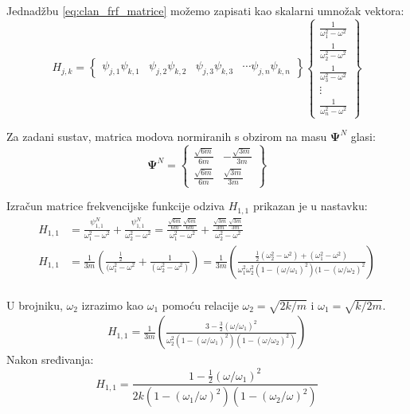 \documentclass{rgn}
\newcommand\ffrac[2]{\frac{\displaystyle #1}{\displaystyle #2}}
\newcommand\ppsi{\mathbf{\Psi}}
\begin{document}
Jednadžbu \eqref{eq:clan_frf_matrice} možemo zapisati kao skalarni umnožak vektora:
\begin{equation}\label{eq:clan_frf_matrica_vektorski}
    H_{j,k}
    =
    \begin{Bmatrix}
        \psi_{j,1}\psi_{k,1} &
        \psi_{j,2}\psi_{k,2} &
        \psi_{j,3}\psi_{k,3} &
        \cdots
        \psi_{j,n}\psi_{k,n}
    \end{Bmatrix}
    \begin{Bmatrix}
        \ffrac{1}{\omega_1^2-\omega^2}\\[6pt]
        \ffrac{1}{\omega_2^2-\omega^2}\\[6pt]
        \ffrac{1}{\omega_3^2-\omega^2}\\[6pt]
        \vdots\\[6pt]
        \ffrac{1}{\omega_n^2-\omega^2}
    \end{Bmatrix}
\end{equation}

Za zadani sustav, matrica modova normiranih s obzirom na masu $\ppsi^N$ glasi:
\[
    \ppsi^N
    =
    \begin{Bmatrix}
        \ffrac{\sqrt{6m}}{6m} & -\ffrac{\sqrt{3m}}{3m}\\[12pt]
        \ffrac{\sqrt{6m}}{6m} & \ffrac{\sqrt{3m}}{3m}
    \end{Bmatrix}
\]

Izračun matrice frekvencijske funkcije odziva $H_{1,1}$ prikazan je u nastavku:
\[
\begin{aligned}
    H_{1,1} &=
    \frac{\psi^N_{1,1}}{\omega_1^2-\omega^2}+\frac{\psi^N_{1,1}}{\omega_2^2-\omega^2}
    =
    \frac{\ffrac{\sqrt{6m}}{6m}\ffrac{\sqrt{6m}}{6m}}{\omega_1^2-\omega^2}
    +
    \frac{\ffrac{\sqrt{3m}}{3m}\ffrac{\sqrt{3m}}{3m}}{\omega_2^2-\omega^2}\\
    H_{1,1} &=
    \frac{1}{3m} 
        \left(
            \frac{\ffrac{1}{2}}{(\omega_1^2-\omega^2}
            +
            \frac{1}{(\omega_2^2-\omega^2)}
        \right)
    =
    \frac{1}{3m}
        \left(
            \frac{\ffrac{1}{2}(\omega_2^2-\omega^2)+(\omega_1^2-\omega^2)}
                {\omega_1^2\omega_2^2(1-(\omega/\omega_1)^2)(1-(\omega/\omega_2)^2}
        \right)\\
\end{aligned}
\]

U brojniku, $\omega_2$ izrazimo kao $\omega_1$ pomoću relacije $\omega_2=\sqrt{2k/m}$
i $\omega_1=\sqrt{k/2m}$.
\[
    \begin{aligned}
        H_{1,1}=
        \frac{1}{3m}
            \left(
                \frac{3-\ffrac{3}{2}(\omega/\omega_1)^2}
                    {\omega_2^2(1-(\omega/\omega_1)^2)(1-(\omega/\omega_2)^2)}
            \right)
    \end{aligned}
\]
Nakon sređivanja:
\begin{equation}\label{eq:frf_11}
    H_{1,1}=\frac{1-\ffrac{1}{2}(\omega/\omega_1)^2}{2k(1-(\omega_1/\omega)^2)(1-(\omega_2/\omega)^2)}
\end{equation}
\end{document}

